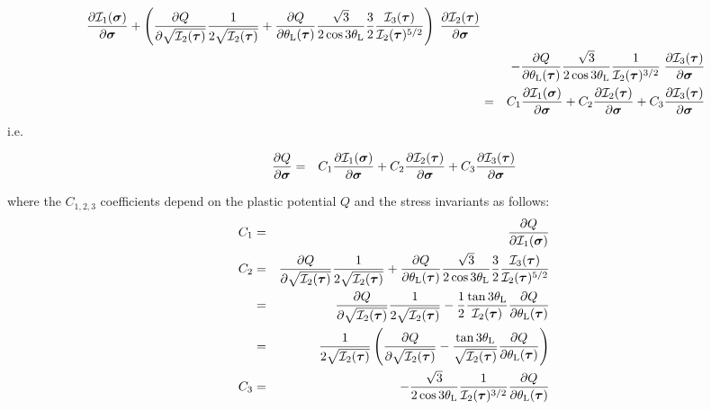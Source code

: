 \begin{eqnarray}
\; \frac{\partial {\cal I}_1(\bm\sigma)}{\partial \bm\sigma} 
+  
\left(\frac{\partial Q}{\partial \sqrt{{\cal I}_2(\bm\tau)}} 
\frac{1}{2 \sqrt{ {\cal I}_2(\bm\tau)}   }   
+
\frac{\partial Q}{\partial \theta_{\rm L}(\bm\tau)} 
\frac{\sqrt{3}}{2\cos 3\theta_{\rm L}}
\frac32  \frac{ {\cal I}_3(\bm\tau)   }{ {\cal I}_2(\bm\tau)^{5/2}}
\right)
\; \frac{\partial {\cal I}_2(\bm\tau)}{\partial \bm\sigma} \nonumber\\
&&
-
\frac{\partial Q}{\partial \theta_{\rm L}(\bm\tau)} 
\frac{\sqrt{3}}{2\cos 3\theta_{\rm L}}
\frac{1}{{\cal I}_2(\bm\tau)^{3/2}} 
\; \frac{\partial {\cal I}_3(\bm\tau)}{\partial \bm\sigma} \nonumber\\
&=& 
C_1  \frac{\partial {\cal I}_1(\bm\sigma)}{\partial \bm\sigma} 
+
C_2  \frac{\partial {\cal I}_2(\bm\tau)}{\partial \bm\sigma} 
+
C_3  \frac{\partial {\cal I}_3(\bm\tau)}{\partial \bm\sigma} 
\end{eqnarray}
i.e.
\begin{mdframed}[backgroundcolor=blue!5]
\begin{eqnarray}
\frac{\partial Q}{\partial \bm\sigma}
&=& 
C_1  \frac{\partial {\cal I}_1(\bm\sigma)}{\partial \bm\sigma} 
+
C_2  \frac{\partial {\cal I}_2(\bm\tau)}{\partial \bm\sigma} 
+
C_3  \frac{\partial {\cal I}_3(\bm\tau)}{\partial \bm\sigma} 
\end{eqnarray}
\end{mdframed}
where the $C_{1,2,3}$ coefficients depend on the plastic potential $Q$
and the stress invariants as follows:
\begin{eqnarray}
C_1 &=&  \frac{\partial Q}{\partial {\cal I}_1(\bm\sigma)} \\
C_2 
&=& \frac{\partial Q}{\partial \sqrt{{\cal I}_2(\bm\tau)}} 
\frac{1}{2 \sqrt{ {\cal I}_2(\bm\tau)}   }   
+
\frac{\partial Q}{\partial \theta_{\rm L}(\bm\tau)} 
\frac{\sqrt{3}}{2\cos 3\theta_{\rm L}}
\frac32  \frac{ {\cal I}_3(\bm\tau)   }{ {\cal I}_2(\bm\tau)^{5/2}} \nonumber\\
&=& 
\frac{\partial Q}{\partial \sqrt{{\cal I}_2(\bm\tau)}} 
\frac{1}{2 \sqrt{ {\cal I}_2(\bm\tau)}   }   
-
\frac12
\frac{\tan 3\theta_{\rm L}}{ {\cal I}_2(\bm\tau)}
\frac{\partial Q}{\partial \theta_{\rm L}(\bm\tau)}  \nonumber\\
&=& 
\frac{1}{2 \sqrt{ {\cal I}_2(\bm\tau)}   }   
\left(
\frac{\partial Q}{\partial \sqrt{{\cal I}_2(\bm\tau)}} 
-
\frac{\tan 3\theta_{\rm L}}{\sqrt {{\cal I}_2(\bm\tau)}}
\frac{\partial Q}{\partial \theta_{\rm L}(\bm\tau)}  
\right)
\\
C_3 &=&  
-
\frac{\sqrt{3}}{2\cos 3\theta_{\rm L}}
\frac{1}{{\cal I}_2(\bm\tau)^{3/2}} 
\frac{\partial Q}{\partial \theta_{\rm L}(\bm\tau)} 
\end{eqnarray}
